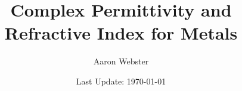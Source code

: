 \documentclass[a4paper]{article}
\begin{document}
\title{Complex Permittivity and Refractive Index for Metals}
\author{Aaron Webster}
\date{Last Update: \today}
\maketitle



\end{document}
